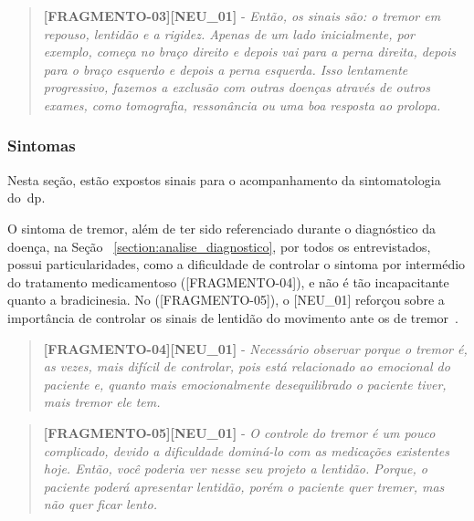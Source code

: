 \begin{quote}
\textbf{[FRAGMENTO-03][NEU\_01]} - 
\emph{
Então, os sinais são: o tremor em repouso, lentidão e a rigidez. Apenas de um lado inicialmente, por exemplo, começa no braço direito e depois vai para a perna direita, depois para o braço esquerdo e depois a perna esquerda. Isso lentamente progressivo, fazemos a exclusão com outras doenças através de outros exames, como tomografia, ressonância ou uma boa resposta ao prolopa.
}
\end{quote}

\subsubsection{Sintomas}
Nesta seção, estão expostos sinais para o acompanhamento da sintomatologia do~\ac{dp}.

O sintoma de tremor, além de ter sido referenciado durante o diagnóstico da doença, na Seção ~\ref{section:analise_diagnostico}, por todos os entrevistados, possui particularidades, como a dificuldade de controlar o sintoma por intermédio do tratamento medicamentoso ([FRAGMENTO-04]), e não é tão incapacitante quanto a bradicinesia. No ([FRAGMENTO-05]), o [NEU\_01] reforçou sobre a importância de controlar os sinais de lentidão do movimento ante os de tremor~\cite{do2007parkinson}.

\begin{quote}
\textbf{[FRAGMENTO-04][NEU\_01]} - 
\emph{
Necessário observar porque o tremor é, as vezes, mais difícil de controlar, pois está relacionado ao emocional do paciente e, quanto mais emocionalmente desequilibrado o paciente tiver, mais tremor ele tem.
}
\end{quote}

\begin{quote}
\textbf{[FRAGMENTO-05][NEU\_01]} - 
\emph{
O controle do tremor é um pouco complicado, devido a dificuldade dominá-lo com as medicações existentes hoje. Então, você poderia ver nesse seu projeto a lentidão. Porque, o paciente poderá apresentar lentidão, porém o paciente quer tremer, mas não quer ficar lento.
}
\end{quote}



